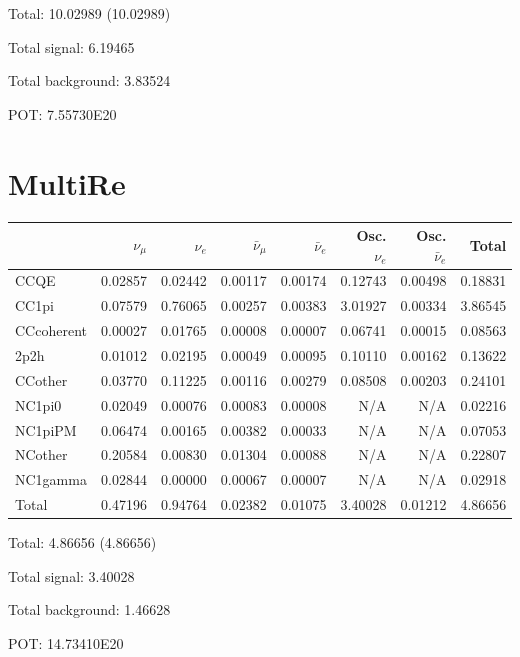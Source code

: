 \documentclass[10pt,a4paper]{article}
\begin{document}
Total: 10.02989    (10.02989)


Total signal: 6.19465


Total background: 3.83524

POT: 7.55730E20



\clearpage


\section*{MultiRe}
\begin{tabular} { | l ||r | r | r | r | r | r | | r | }
\hline
              & $\nu_\mu$            & $\nu_e$              & $\bar{\nu}_{\mu}$    & $\bar{\nu}_{e}$      & Osc. $\nu_e$         & Osc. $\bar{\nu}_{e}$ & Total                \\ \hline\hline
 CCQE         & 0.02857              & 0.02442              & 0.00117              & 0.00174              & 0.12743              & 0.00498              & 0.18831              \\ \hline
 CC1pi        & 0.07579              & 0.76065              & 0.00257              & 0.00383              & 3.01927              & 0.00334              & 3.86545              \\ \hline
 CCcoherent   & 0.00027              & 0.01765              & 0.00008              & 0.00007              & 0.06741              & 0.00015              & 0.08563              \\ \hline
 2p2h         & 0.01012              & 0.02195              & 0.00049              & 0.00095              & 0.10110              & 0.00162              & 0.13622              \\ \hline
 CCother      & 0.03770              & 0.11225              & 0.00116              & 0.00279              & 0.08508              & 0.00203              & 0.24101              \\ \hline
 NC1pi0       & 0.02049              & 0.00076              & 0.00083              & 0.00008              & N/A                  & N/A                  & 0.02216              \\ \hline
 NC1piPM      & 0.06474              & 0.00165              & 0.00382              & 0.00033              & N/A                  & N/A                  & 0.07053              \\ \hline
 NCother      & 0.20584              & 0.00830              & 0.01304              & 0.00088              & N/A                  & N/A                  & 0.22807              \\ \hline
 NC1gamma     & 0.02844              & 0.00000              & 0.00067              & 0.00007              & N/A                  & N/A                  & 0.02918              \\ \hline
\hline
 Total        & 0.47196              & 0.94764              & 0.02382              & 0.01075              & 3.40028              & 0.01212              & 4.86656              \\ \hline

\end{tabular}

Total: 4.86656    (4.86656)


Total signal: 3.40028


Total background: 1.46628

POT: 14.73410E20
\end{document}
